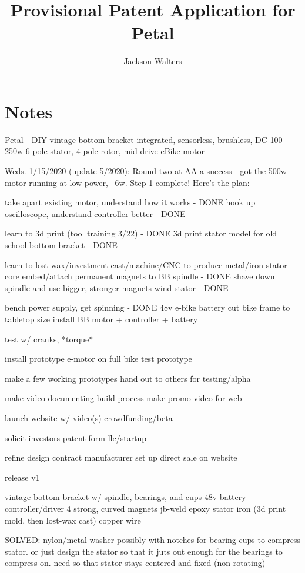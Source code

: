 \documentclass[11pt]{article} %
\title{Provisional Patent Application for Petal}
\author{Jackson Walters}
\begin{document}
\maketitle

\section{Notes}

Petal - DIY vintage bottom bracket integrated, sensorless, brushless, DC 100-250w 6 pole stator, 4 pole rotor, mid-drive eBike motor



Weds. 1/15/2020 (update 5/2020): Round two at AA a success - got the 500w motor running at low power, ~6w. Step 1 complete! Here’s the plan:

take apart existing motor, understand how it works - DONE
hook up oscilloscope, understand controller better - DONE

learn to 3d print (tool training 3/22) - DONE 
3d print stator model for old school bottom bracket - DONE

learn to lost wax/investment cast/machine/CNC to produce metal/iron stator core
embed/attach permanent magnets to BB spindle - DONE
shave down spindle and use bigger, stronger magnets
wind stator - DONE

bench power supply, get spinning - DONE
48v e-bike battery
cut bike frame to tabletop size
install BB motor + controller + battery

test w/ cranks, *torque*

install prototype e-motor on full bike
test prototype



make a few working prototypes
hand out to others for testing/alpha

make video documenting build process
make promo video for web

launch website w/ video(s)
crowdfunding/beta

solicit investors
patent
form llc/startup

refine design
contract manufacturer
set up direct sale on website

release v1


vintage bottom bracket w/ spindle, bearings, and cups
48v battery
controller/driver
4 strong, curved magnets
jb-weld epoxy
stator iron (3d print mold, then lost-wax cast)
copper wire

SOLVED: nylon/metal washer possibly with notches for bearing cups to compress stator. or just design the stator so that it juts out enough for the bearings to compress on. need so that stator stays centered and fixed (non-rotating)
\end{document}
